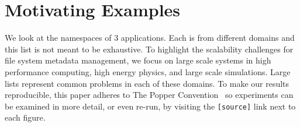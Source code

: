 \vspace{-0.5em}
\section{Motivating Examples}
\label{sec:motivating-examples}
\vspace{-0.5em}

We look at the namespaces of 3 applications.  Each is from different domains
and this list is not meant to be exhaustive.  To highlight the scalability
challenges for file system metadata management, we focus on large scale systems
in high performance computing, high energy physics, and large scale
simulations. Large lists represent common problems in each of these domains.
To make our results reproducible, this paper adheres to The Popper
Convention~\cite{jimenez:ipdpsw17-popper} so experiments can be examined in
more detail, or even re-run, by visiting the \texttt{[source]} link next to
each figure. 


